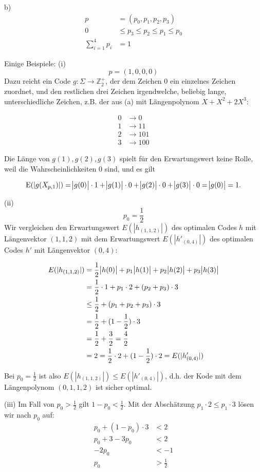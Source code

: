 b)
\begin{align*}
p &= \left( p_{0}, p_{1}, p_{2}, p_{3} \right) \\
0 &\leq p_3 \leq p_2 \leq p_1 \leq p_0 \\
\sum_{i=1}^{4} p_i &= 1
\end{align*}

Einige Beispiele:
(i)
\[ p = (1, 0, 0, 0) \]
Dazu reicht ein Code $g : \Sigma \rightarrow \mathbb{Z}_{2}^{+}$, der dem Zeichen $0$ ein einzelnes Zeichen zuordnet,
und den restlichen drei Zeichen irgendwelche, beliebig lange, unterschiedliche Zeichen, z.B. der aus (a) mit Längenpolynom
$X + X^{2} + 2X^{3}$:

\begin{align*}
0 &\rightarrow 0 \\
1 &\rightarrow 11 \\
2 &\rightarrow 101 \\
3 &\rightarrow 100
\end{align*}

Die Länge von $g(1), g(2), g(3)$ spielt für den Erwartungswert keine Rolle, weil die Wahrscheinlichkeiten $0$ sind, und es gilt

\[
\mathrm{E}(|g(X_{p,1})|) = \abs{g(0)}\cdot 1 + \abs{g(1)}\cdot 0 + \abs{g(2)}\cdot 0 + \abs{g(3)}\cdot 0 = \abs{g(0)} = 1.
\]

(ii)
\[ p_{0} = \frac{1}{2} \]
Wir vergleichen den Erwartungswert $E(|h_{(1,1,2)}|)$ des optimalen Codes $h$ mit Längenvektor $(1,1,2)$ mit dem
Erwartungswert $E(|h'_{(0,4)}|)$ des optimalen Codes $h'$ mit Längenvektor $(0,4)$:

\begin{align*}
E(|h_{(1,1,2)}|) &= \frac{1}{2}\abs{h(0)} + p_{1}\abs{h(1)} + p_{2}\abs{h(2)} + p_{3}\abs{h(3)} \\
&= \frac{1}{2}\cdot 1 + p_{1}\cdot 2 + (p_{2} + p_{3})\cdot 3 \\
&\leq \frac{1}{2} + (p_{1} + p_{2} + p_{3})\cdot 3 \\
&= \frac{1}{2} + (1-\frac{1}{2})\cdot 3 \\
&= \frac{1}{2} + \frac{3}{2} = \frac{4}{2} \\
&= 2 = \frac{1}{2}\cdot 2 + (1 - \frac{1}{2})\cdot 2 = E(|h'_{(0,4)}|)
\end{align*}

Bei $p_{0} = \frac{1}{2}$ ist also $E(|h_{(1,1,2)}|) \leq E(|h'_{(0,4)}|)$, d.h. der Kode mit dem Längenpolynom $(0,1,1,2)$ ist sicher optimal.

(iii)
Im Fall von $p_{0} > \frac{1}{2}$ gilt $1-p_{0} < \frac{1}{2}$. Mit der Abschätzung $p_{1}\cdot 2 \leq p_{1}\cdot 3$ lösen wir nach $p_{0}$ auf:
\begin{align*}
p_{0} + (1-p_{0})\cdot 3 &< 2 \\
p_{0} + 3 - 3p_{0} &< 2 \\
-2p_{0} &< -1 \\
p_{0} &> \frac{1}{2}
\end{align*}

